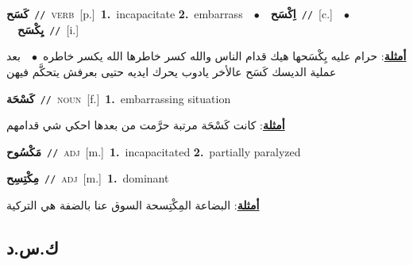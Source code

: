 \documentclass[10pt,a4paper,twoside]{article} %
\begin{document}
\begin{multicols}{2}
{\setlength\topsep{0pt}\textbf{\foreignlanguage{arabic}{كَسَح}}\ {\color{gray}\texttt{//}\color{black}}\ \textsc{verb}\ [p.]\ \textbf{1.}~incapacitate  \textbf{2.}~embarrass\ \ $\bullet$\ \ \setlength\topsep{0pt}\textbf{\foreignlanguage{arabic}{اِكْسَح}}\ {\color{gray}\texttt{//}\color{black}}\ [c.]\ \ $\bullet$\ \ \setlength\topsep{0pt}\textbf{\foreignlanguage{arabic}{يِكْسَح}}\ {\color{gray}\texttt{//}\color{black}}\ [i.]\  \begin{flushright}\color{gray}\foreignlanguage{arabic}{\textbf{\underline{\foreignlanguage{arabic}{أمثلة}}}: حرام عليه يِكْسَحها هيك قدام الناس والله كسر خاطرها الله يكسر خاطره\ $\bullet$\ \  بعد عملية الديسك كَسَح عالأخر يادوب يحرك ايديه حتيى بعرفش يتحكَّم فيهن}\end{flushright}\color{black}} \vspace{2mm}

{\setlength\topsep{0pt}\textbf{\foreignlanguage{arabic}{كَسْحَة}}\ {\color{gray}\texttt{//}\color{black}}\ \textsc{noun}\ [f.]\ \textbf{1.}~embarrassing situation\  \begin{flushright}\color{gray}\foreignlanguage{arabic}{\textbf{\underline{\foreignlanguage{arabic}{أمثلة}}}: كانت كَسْحَة مرتبة حرَّمت من بعدها احكي شي قدامهم}\end{flushright}\color{black}} \vspace{2mm}

{\setlength\topsep{0pt}\textbf{\foreignlanguage{arabic}{مَكْسُوح}}\ {\color{gray}\texttt{//}\color{black}}\ \textsc{adj}\ [m.]\ \textbf{1.}~incapacitated  \textbf{2.}~partially paralyzed\ } \vspace{2mm}

{\setlength\topsep{0pt}\textbf{\foreignlanguage{arabic}{مِكْتِسِح}}\ {\color{gray}\texttt{//}\color{black}}\ \textsc{adj}\ [m.]\ \textbf{1.}~dominant\  \begin{flushright}\color{gray}\foreignlanguage{arabic}{\textbf{\underline{\foreignlanguage{arabic}{أمثلة}}}: البضاعة المِكْتِسحة السوق عنا بالضفة هي التركية}\end{flushright}\color{black}} \vspace{2mm}

\vspace{-3mm}
\subsection*{\color{blue}\foreignlanguage{arabic}{ك.س.د}\color{blue}{}} 


\end{multicols}
\end{document}
